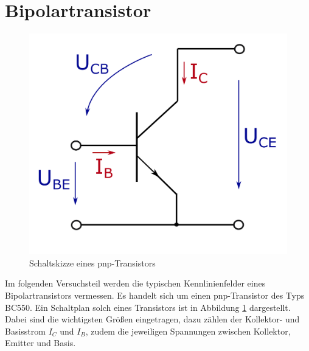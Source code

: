 \documentclass[12pt,a4paper,ngerman]{report}
\begin{document}
	\section{Bipolartransistor}
		\begin{figure}[ht]
			\centering
			\includegraphics[width=7.5 cm]{plots/transistor_schaltung.png}
			\caption{Schaltskizze eines pnp-Transistors}
			\label{img:pnpSchaltung}
		\end{figure} 
		Im folgenden Versuchsteil werden die typischen Kennlinienfelder eines Bipolartransistors vermessen. Es handelt sich um einen pnp-Transistor des Typs BC550. Ein Schaltplan solch eines Transistors ist in Abbildung \ref{img:pnpSchaltung} dargestellt. Dabei sind die wichtigsten Größen eingetragen, dazu zählen der Kollektor- und Basisstrom $I_C$ und $I_B$, zudem die jeweiligen Spannungen zwischen Kollektor, Emitter und Basis. 
\end{document}
